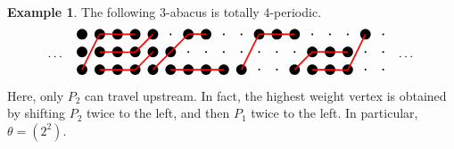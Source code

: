 \documentclass[12pt]{amsart}
\numberwithin{equation}{section}
\theoremstyle{definition}
\newtheorem{example}[equation]{Example}
\newcommand\TikZ[1]{\begin{matrix}\begin{tikzpicture}#1\end{tikzpicture}\end{matrix}}
\begin{document}
\begin{example} 
The following $3$-abacus is totally $4$-periodic.
$$\dots\quad\TikZ{[scale=.5]
\draw
(8,0)node[fill,circle,inner sep=.5pt]{}
(8,1)node[fill,circle,inner sep=.5pt]{}
(8,2)node[fill,circle,inner sep=.5pt]{}
(7,0)node[fill,circle,inner sep=.5pt]{}
(7,1)node[fill,circle,inner sep=.5pt]{}
(7,2)node[fill,circle,inner sep=3pt]{}
(6,0)node[fill,circle,inner sep=3pt]{}
(6,1)node[fill,circle,inner sep=3pt]{}
(6,2)node[fill,circle,inner sep=.5pt]{}
(5,0)node[fill,circle,inner sep=3pt]{}
(5,1)node[fill,circle,inner sep=3pt]{}
(5,2)node[fill,circle,inner sep=.5pt]{}
(4,0)node[fill,circle,inner sep=3pt]{}
(4,1)node[fill,circle,inner sep=3pt]{}
(4,2)node[fill,circle,inner sep=.5pt]{}
(3,0)node[fill,circle,inner sep=3pt]{}
(3,1)node[fill,circle,inner sep=.5pt]{}
(3,2)node[fill,circle,inner sep=3pt]{}
(2,0)node[fill,circle,inner sep=.5pt]{}
(2,1)node[fill,circle,inner sep=.5pt]{}
(2,2)node[fill,circle,inner sep=3pt]{}
(1,0)node[fill,circle,inner sep=.5pt]{}
(1,1)node[fill,circle,inner sep=.5pt]{}
(1,2)node[fill,circle,inner sep=3pt]{}
(0,0)node[fill,circle,inner sep=3pt]{}
(0,1)node[fill,circle,inner sep=.5pt]{}
(0,2)node[fill,circle,inner sep=.5pt]{}
(-1,0)node[fill,circle,inner sep=3pt]{}
(-1,1)node[fill,circle,inner sep=.5pt]{}
(-1,2)node[fill,circle,inner sep=.5pt]{}
(-2,0)node[fill,circle,inner sep=3pt]{}
(-2,1)node[fill,circle,inner sep=.5pt]{}
(-2,2)node[fill,circle,inner sep=3pt]{}
(-3,0)node[fill,circle,inner sep=3pt]{}
(-3,1)node[fill,circle,inner sep=.5pt]{}
(-3,2)node[fill,circle,inner sep=3pt]{}
(-4,0)node[fill,circle,inner sep=3pt]{}
(-4,1)node[fill,circle,inner sep=3pt]{}
(-4,2)node[fill,circle,inner sep=.5pt]{}
(-5,0)node[fill,circle,inner sep=3pt]{}
(-5,1)node[fill,circle,inner sep=3pt]{}
(-5,2)node[fill,circle,inner sep=3pt]{}
(-6,0)node[fill,circle,inner sep=3pt]{}
(-6,1)node[fill,circle,inner sep=3pt]{}
(-6,2)node[fill,circle,inner sep=3pt]{}
(-7,0)node[fill,circle,inner sep=3pt]{}
(-7,1)node[fill,circle,inner sep=3pt]{}
(-7,2)node[fill,circle,inner sep=3pt]{}
(-8,0)node[fill,circle,inner sep=3pt]{}
(-8,1)node[fill,circle,inner sep=3pt]{}
(-8,2)node[fill,circle,inner sep=3pt]{}
(-9,0)node[fill,circle,inner sep=3pt]{}
(-9,1)node[fill,circle,inner sep=3pt]{}
(-9,2)node[fill,circle,inner sep=3pt]{}
;

\draw[very thick,red] plot [smooth,tension=.1] coordinates{(7,2)(6,0)(5,0)(4,0)};
\draw[very thick,red] plot [smooth,tension=.1] coordinates{(6,1)(5,1)(4,1)(3,0)};
\draw[very thick,red] plot [smooth,tension=.1] coordinates{(3,2)(2,2)(1,2)(0,0)};
\draw[very thick,red] plot [smooth,tension=.1] coordinates{(-1,0)(-2,0)(-3,0)(-4,0)};
\draw[very thick,red] plot [smooth,tension=.1] coordinates{(-2,2)(-3,2)(-4,1)(-5,0)};
\draw[very thick,red] plot [smooth,tension=.1] coordinates{(-5,1)(-6,0)(-7,0)(-8,0)};
\draw[very thick,red] plot [smooth,tension=.1] coordinates{(-5,2)(-6,1)(-7,1)(-8,1)};
\draw[very thick,red] plot [smooth,tension=.1] coordinates{(-6,2)(-7,2)(-8,2)(-9,0)};
}\quad\dots
$$
Here, only $P_2$ can travel upstream. In fact, the highest weight vertex is obtained by shifting $P_2$ twice to the left, and then $P_1$ twice to the left.
In particular, $\theta=(2^2)$.
\end{example}
\end{document}
